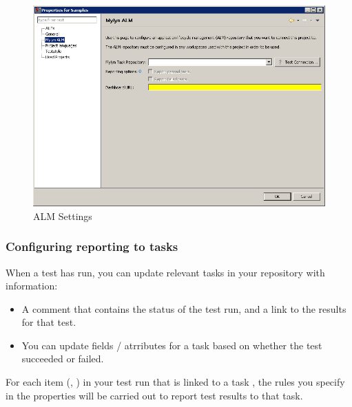 \begin{figure}[h]
\begin{center}
\includegraphics[width=12.5cm]{Tasks/ALM/PS/almproperties}
\caption{ALM Settings}
\label{TasksALMProjectProperties}
\end{center}
\end{figure}

\subsubsection{Configuring reporting to tasks}
\label{TasksALMConfigureProject}
When a test has run, you can update relevant tasks in your repository with information:\\
\begin{itemize}
\item A comment that contains the status of the test run, and a link to the results for that test.
\item You can update fields / atrributes for a task based on whether the test succeeded or failed. 
\end{itemize}
For each item (\gdcase{}, \gdsuite{}) in your test run that is linked to a task , the rules you specify in the \gdproject{} properties will be carried out to report test results to that task. 


